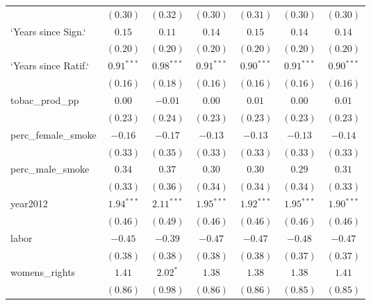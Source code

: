 \begin{table}[!h]
\begin{center}
\begin{tabular}{l c c c c c c }
                        & $(0.30)$     & $(0.32)$     & $(0.30)$     & $(0.31)$     & $(0.30)$     & $(0.30)$     \\
`Years since Sign.`     & $0.15$       & $0.11$       & $0.14$       & $0.15$       & $0.14$       & $0.14$       \\
                        & $(0.20)$     & $(0.20)$     & $(0.20)$     & $(0.20)$     & $(0.20)$     & $(0.20)$     \\
`Years since Ratif.`    & $0.91^{***}$ & $0.98^{***}$ & $0.91^{***}$ & $0.90^{***}$ & $0.91^{***}$ & $0.90^{***}$ \\
                        & $(0.16)$     & $(0.18)$     & $(0.16)$     & $(0.16)$     & $(0.16)$     & $(0.16)$     \\
tobac\_prod\_pp         & $0.00$       & $-0.01$      & $0.00$       & $0.01$       & $0.00$       & $0.01$       \\
                        & $(0.23)$     & $(0.24)$     & $(0.23)$     & $(0.23)$     & $(0.23)$     & $(0.23)$     \\
perc\_female\_smoke     & $-0.16$      & $-0.17$      & $-0.13$      & $-0.13$      & $-0.13$      & $-0.14$      \\
                        & $(0.33)$     & $(0.35)$     & $(0.33)$     & $(0.33)$     & $(0.33)$     & $(0.33)$     \\
perc\_male\_smoke       & $0.34$       & $0.37$       & $0.30$       & $0.30$       & $0.29$       & $0.31$       \\
                        & $(0.33)$     & $(0.36)$     & $(0.34)$     & $(0.34)$     & $(0.34)$     & $(0.33)$     \\
year2012                & $1.94^{***}$ & $2.11^{***}$ & $1.95^{***}$ & $1.92^{***}$ & $1.95^{***}$ & $1.90^{***}$ \\
                        & $(0.46)$     & $(0.49)$     & $(0.46)$     & $(0.46)$     & $(0.46)$     & $(0.46)$     \\
labor                   & $-0.45$      & $-0.39$      & $-0.47$      & $-0.47$      & $-0.48$      & $-0.47$      \\
                        & $(0.38)$     & $(0.38)$     & $(0.38)$     & $(0.38)$     & $(0.37)$     & $(0.37)$     \\
womens\_rights          & $1.41$       & $2.02^{*}$   & $1.38$       & $1.38$       & $1.38$       & $1.41$       \\
                        & $(0.86)$     & $(0.98)$     & $(0.86)$     & $(0.86)$     & $(0.85)$     & $(0.85)$     \\

\end{tabular}
\end{center}
\end{table}
